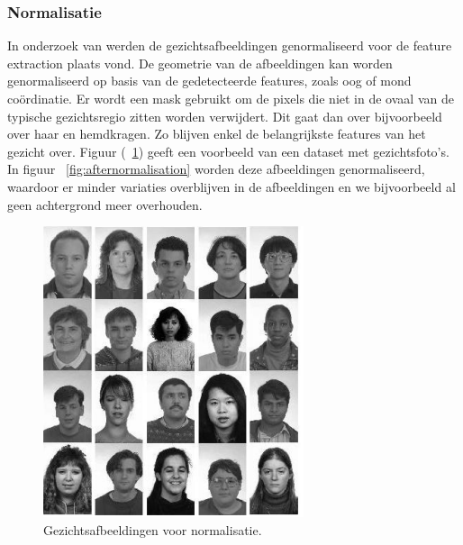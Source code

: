 \subsubsection{Normalisatie}
In onderzoek van \autocite{Chen2011} werden de gezichtsafbeeldingen genormaliseerd voor de feature extraction plaats vond. De geometrie van de afbeeldingen kan worden genormaliseerd op basis van de gedetecteerde features, zoals oog of mond coördinatie. Er wordt een mask gebruikt om de pixels die niet in de ovaal van de typische gezichtsregio zitten worden verwijdert. Dit gaat dan over bijvoorbeeld over haar en hemdkragen. Zo blijven enkel de belangrijkste features van het gezicht over. Figuur (~\ref{fig:beforenormalisation}) geeft een voorbeeld van een dataset met gezichtsfoto's. In figuur {~\ref{fig:afternormalisation}} worden deze afbeeldingen genormaliseerd, waardoor er minder variaties overblijven in de afbeeldingen en we bijvoorbeeld al geen achtergrond meer overhouden.
\begin{figure}
    \centering
    \includegraphics[width=\columnwidth]{graphics/beforenorm.PNG}
    \caption{\label{fig:beforenormalisation}Gezichtsafbeeldingen voor normalisatie\autocite{Chen2011}.}
\end{figure}
